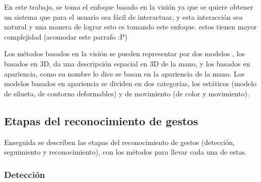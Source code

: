 En este trabajo, se toma el enfoque basado en la visi\'on ya que se quiere obtener un sistema que para el usuario sea fácil de interactuar, y esta interacci\'on sea natural y una manera de lograr esto es tomando este enfoque.  estos tienen mayor complejidad (acomodar este parrafo :P)


Los métodos basados en la visión se pueden representar por dos modelos \citep{Rautaray2012}, los basados en 3D, da una descripción espacial en 3D de la mano, y los basados en apariencia, como su nombre lo dice se basan en la apariencia de la mano. Los modelos basados en apariencia se dividen en dos categorías, los estáticos (modelo de silueta, de contorno deformables) y de movimiento (de color y movimiento).

\subsection{Etapas del reconocimiento de gestos}\label{subsec:EtapasReconocimiento} 
Enseguida se describen las etapas del reconocimiento de gestos (detección, seguimiento y reconocimiento), con los métodos para llevar cada una de estas.  



\subsubsection{Detección}\label{sssec:EtapaDeteccion}

